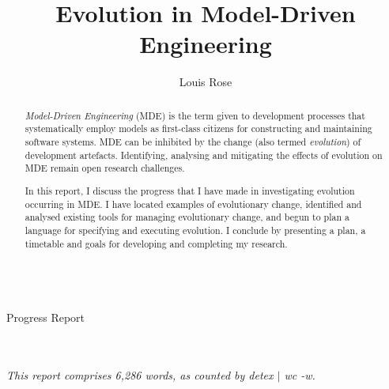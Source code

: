 \documentclass[a4paper,10pt]{article}
\title{Evolution in Model-Driven Engineering}
\author{Louis Rose}
\makeatletter
\renewcommand{\maketitle}{
  \begin{titlepage}
    \center
    \vspace*{\stretch{1}}
    \textsf{\huge \bfseries\sf \@title}\\
    \bigskip
    {\LARGE Progress Report}\\
    \vspace*{\stretch{1}}
    {\Large \@author}\\
    \bigskip
    {\Large \@date}\\
    \vspace*{\stretch{2}}
  \end{titlepage}
}
\makeatother
\begin{document}

\maketitle

\begin{abstract}
\textit{Model-Driven Engineering} (MDE) is the term given to development processes that systematically employ models as first-class citizens for constructing and maintaining software systems. MDE can be inhibited by the change (also termed \textit{evolution}) of development artefacts. Identifying, analysing and mitigating the effects of evolution on MDE remain open research challenges.

In this report, I discuss the progress that I have made in investigating evolution occurring in MDE. I have located examples of evolutionary change, identified and analysed existing tools for managing evolutionary change, and begun to plan a language for specifying and executing evolution. I conclude by presenting a plan, a timetable and goals for developing and completing my research.
\end{abstract}

\vspace{2mm}

\begin{center}
  \small{\textit{This report comprises 6,286 words, as counted by detex $|$ wc -w.}}
\end{center}

\newpage
\tableofcontents
\newpage








\end{document}
